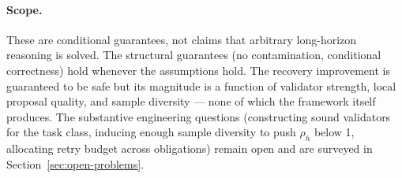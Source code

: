 \documentclass[11pt]{article}
\begin{document}
\paragraph{Scope.}
These are conditional guarantees, not claims that arbitrary long-horizon
reasoning is solved. The structural guarantees (no contamination, conditional
correctness) hold whenever the assumptions hold. The recovery improvement is
guaranteed to be safe but its magnitude is a function of validator strength,
local proposal quality, and sample diversity — none of which the framework
itself produces. The substantive engineering questions (constructing sound
validators for the task class, inducing enough sample diversity to push
$\rho_h$ below 1, allocating retry budget across obligations) remain open
and are surveyed in Section~\ref{sec:open-problems}.
\end{document}
